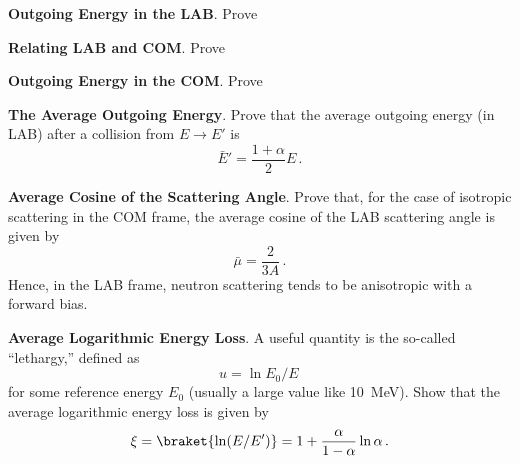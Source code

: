 \begin{exercises}

  \item \textbf{Outgoing Energy in the LAB}. 
    Prove 

  \item \textbf{Relating LAB and COM}. 
    Prove 
 
  \item \textbf{Outgoing Energy in the COM}. 
    Prove 
    
  \item \textbf{The Average Outgoing Energy}. 
    Prove that the average outgoing energy (in LAB) 
    after a collision from $E\to E'$
    is 
    \begin{equation*}
      \bar{E}' = \frac{1+\alpha}{2} E \, .
    \end{equation*}

  \item \textbf{Average Cosine of the Scattering Angle}. 
    Prove that, for the case of isotropic scattering in the COM frame, 
    the average cosine of the LAB scattering angle is given by
    \begin{equation*}
      \bar{\mu} = \frac{2}{3A} \, .
    \end{equation*}  
    Hence, in the LAB frame, neutron scattering tends to be anisotropic 
    with a forward bias.

  \item \textbf{Average Logarithmic Energy Loss}. 
    A useful quantity is the so-called ``lethargy,'' defined as
    \begin{equation}
     u = \ln E_0 / E \, 
    \end{equation}
    for some reference energy $E_0$ (usually a large value like 10~MeV).
    Show that the average logarithmic energy loss is given by
    \begin{equation}
     \xi = \braket{\ln(E/E')} = 1 + \frac{\alpha}{1-\alpha}\ln{\alpha} \, .
    \end{equation}
    


\end{exercises}
